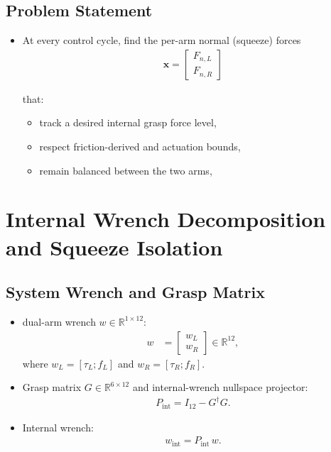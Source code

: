 \documentclass[conference]{IEEEtran}
\begin{document}
\subsection*{Problem Statement}
\begin{itemize}
    \item At every control cycle, find the per-arm normal (squeeze) forces
    \begin{align}
                \mathbf{x} = \begin{bmatrix}
            F_{n,L} \\
            F_{n,R}
        \end{bmatrix}
    \end{align}

    that:
    \begin{itemize}
        \item track a desired internal grasp force level,
        \item respect friction-derived and actuation bounds,
        \item remain balanced between the two arms,
    \end{itemize}
\end{itemize}

\section*{Internal Wrench Decomposition and Squeeze Isolation}

\subsection*{System Wrench and Grasp Matrix}
\begin{itemize}
    \item dual-arm wrench $w\in \mathbb{R}^{1\times12}$:
    \begin{align}
        w &=
        \begin{bmatrix}
            w_L \\
            w_R
        \end{bmatrix}
        \in \mathbb{R}^{12},
    \end{align}
    where \(w_L = [\tau_L; f_L]\) and \(w_R = [\tau_R; f_R]\).

    \item Grasp matrix \(G \in \mathbb{R}^{6 \times 12}\) and internal-wrench nullspace projector:
    \begin{align}
        P_{\mathrm{int}} = I_{12} - G^\dagger G.
    \end{align}

    \item Internal wrench:
    \begin{align}
        w_{\mathrm{int}} = P_{\mathrm{int}}\, w.
    \end{align}
\end{itemize}
\end{document}
